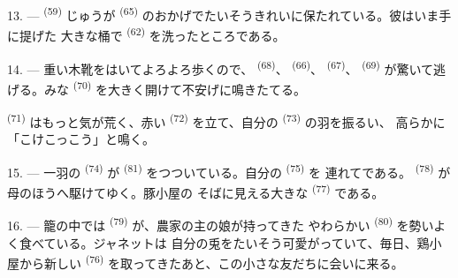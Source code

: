 13. ---  \textsuperscript{(59)} じゅうが
\textsuperscript{(65)} のおかげでたいそうきれいに保たれている。彼はいま手に提げた
大きな桶で \textsuperscript{(62)} を洗ったところである。

\VUsaut{3.0mm}
\VUsaut{3.0mm}

14. --- 重い木靴をはいてよろよろ歩くので、 \textsuperscript{(68)}、
 \textsuperscript{(66)}、 \textsuperscript{(67)}、
 \textsuperscript{(69)} が驚いて逃げる。みな
\textsuperscript{(70)} を大きく開けて不安げに鳴きたてる。

 \textsuperscript{(71)} はもっと気が荒く、赤い
\textsuperscript{(72)} を立て、自分の \textsuperscript{(73)} の羽を振るい、
高らかに「こけこっこう」と鳴く。

15. --- 一羽の \textsuperscript{(74)} が
\textsuperscript{(81)} をつついている。自分の \textsuperscript{(75)} を
連れてである。 \textsuperscript{(78)} が母のほうへ駆けてゆく。豚小屋の
そばに見える大きな \textsuperscript{(77)} である。

16. --- 籠の中では \textsuperscript{(79)} が、農家の主の娘が持ってきた
やわらかい \textsuperscript{(80)} を勢いよく食べている。ジャネットは
自分の兎をたいそう可愛がっていて、毎日、鶏小屋から新しい
\textsuperscript{(76)} を取ってきたあと、この小さな友だちに会いに来る。
\VUsaut{6.0mm}
\VUfilet{22mm}
